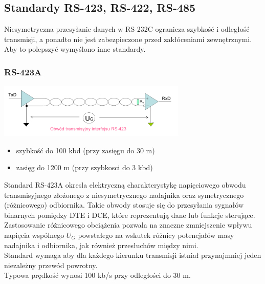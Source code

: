 \documentclass[a4paper,twoside]{article}
\begin{document}
	\subsection{Standardy RS-423, RS-422, RS-485}
	Niesymetryczna przesyłanie danych w RS-232C ogranicza szybkość i odległość transmisji, a ponadto nie jest zabezpieczone przed zakłóceniami zewnętrznymi. Aby to polepszyć wymyślono inne standardy.
		\subsubsection{RS-423A}
		\includegraphics[width=9cm]{./wyklady/RS232_12_1.pdf}
		\begin{itemize}
			\item szybkość do 100 kbd (przy zasięgu do 30 m)
			\item zasięg do 1200 m (przy szybkosci do 3 kbd)
		\end{itemize}
		Standard RS-423A okresla elektryczną charakterystykę napięciowego obwodu transmisyjnego złożonego z niesymetrycznego nadajnika oraz symetrycznego (różnicowego) odbiornika. Takie obwody stosuje się do przesyłania sygnałów binarnych pomiędzy DTE i DCE, które reprezentują dane lub funkcje sterujące.\\
		Zastosowanie różnicowego obciążenia pozwala na znaczne zmniejszenie wpływu napięcia wspólnego $U_{G}$ powstałego na wskutek różnicy potencjałów masy nadajnika i odbiornika, jak również przesłuchów między nimi.\\
		Standard wymaga aby dla każdego kierunku transmisji istniał przynajmniej jeden niezależny przewód powrotny.\\
		Typowa prędkość wynosi 100 kb/s przy odległości do 30 m.
\end{document}
